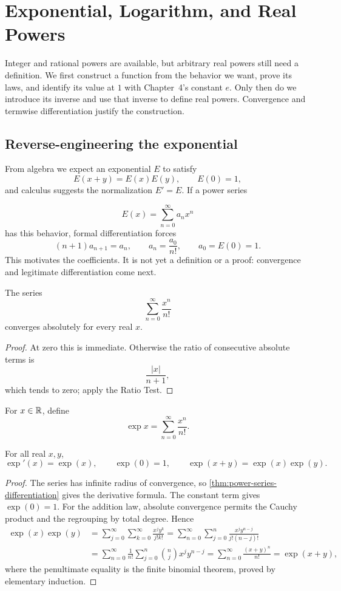 \section{Exponential, Logarithm, and Real Powers}
\label{sec:exponential-logarithm}
Integer and rational powers are available, but arbitrary real powers still
need a definition. We first construct a function from the behavior we want,
prove its laws, and identify its value at $1$ with Chapter~4's constant $e$.
Only then do we introduce its inverse and use that inverse to define real
powers. Convergence and termwise differentiation justify the construction.

\subsection*{Reverse-engineering the exponential}
From algebra we expect an exponential \(E\) to satisfy
\[
E(x+y)=E(x)E(y),
\qquad E(0)=1,
\]
and calculus suggests the normalization $E'=E$. If a power series

\[
E(x)=\sum_{n=0}^{\infty}a_nx^n
\]
 has this behavior, formal differentiation
forces
\[
(n+1)a_{n+1}=a_n,\qquad a_n=\frac{a_0}{n!},\qquad a_0=E(0)=1.
\]
This motivates the coefficients. It is not yet a definition or a proof:
convergence and legitimate differentiation come next.

\begin{proposition}
\label{prop:exponential-series-convergence}
The series
\[
\sum_{n=0}^{\infty}\frac{x^n}{n!}
\]
 converges absolutely for every real $x$.
\end{proposition}
\begin{proof}
At zero this is immediate. Otherwise the ratio of consecutive absolute
terms is
\[
\frac{|x|}{n+1},
\]
 which tends to zero; apply the Ratio Test.
\end{proof}
\begin{definition}\label{def:analytic-exponential}
For $x\in\mathbb{R}$, define
\[
\exp x=\sum_{n=0}^{\infty}\frac{x^n}{n!}.
\]
\end{definition}
\begin{theorem}
\label{thm:exponential-identities}
For all real $x,y$,
\[
\exp'(x)=\exp(x),\qquad \exp(0)=1,\qquad
\exp(x+y)=\exp(x)\exp(y).
\]
\end{theorem}
\begin{proof}
The series has infinite radius of convergence, so
\cref{thm:power-series-differentiation} gives the derivative formula.
The constant term gives $\exp(0)=1$. For the addition law,
absolute convergence permits the Cauchy product and the regrouping by total
degree. Hence
\begin{align*}
\exp(x)\exp(y)
&=\sum_{j=0}^{\infty}\sum_{k=0}^{\infty}
  \frac{x^j y^k}{j!k!}
=\sum_{n=0}^{\infty}\sum_{j=0}^{n}
  \frac{x^j y^{n-j}}{j!(n-j)!}\\
&=\sum_{n=0}^{\infty}\frac1{n!}
  \sum_{j=0}^{n}\binom nj x^j y^{n-j}
=\sum_{n=0}^{\infty}\frac{(x+y)^n}{n!}
=\exp(x+y),
\end{align*}
where the penultimate equality is the finite binomial theorem, proved by
elementary induction.
\end{proof}

